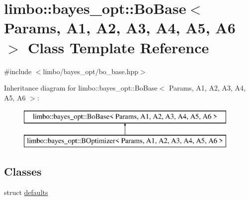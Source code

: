 \hypertarget{classlimbo_1_1bayes__opt_1_1_bo_base}{}\section{limbo\+:\+:bayes\+\_\+opt\+:\+:Bo\+Base$<$ Params, A1, A2, A3, A4, A5, A6 $>$ Class Template Reference}
\label{classlimbo_1_1bayes__opt_1_1_bo_base}


{\ttfamily \#include $<$limbo/bayes\+\_\+opt/bo\+\_\+base.\+hpp$>$}

Inheritance diagram for limbo\+:\+:bayes\+\_\+opt\+:\+:Bo\+Base$<$ Params, A1, A2, A3, A4, A5, A6 $>$\+:\begin{figure}[H]
\begin{center}
\leavevmode
\includegraphics[height=2.000000cm]{classlimbo_1_1bayes__opt_1_1_bo_base}
\end{center}
\end{figure}
\subsection*{Classes}
\begin{DoxyCompactItemize}
\item 
struct \hyperlink{structlimbo_1_1bayes__opt_1_1_bo_base_1_1defaults}{defaults}
\end{DoxyCompactItemize}
